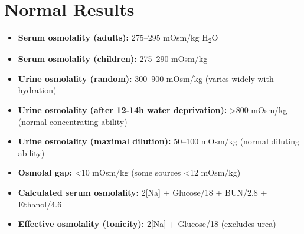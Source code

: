 \section*{Normal Results}
\begin{itemize}
  \item \textbf{Serum osmolality (adults):} 275--295 mOsm/kg H\textsubscript{2}O
  \item \textbf{Serum osmolality (children):} 275--290 mOsm/kg
  \item \textbf{Urine osmolality (random):} 300--900 mOsm/kg (varies widely with hydration)
  \item \textbf{Urine osmolality (after 12-14h water deprivation):} >800 mOsm/kg (normal concentrating ability)
  \item \textbf{Urine osmolality (maximal dilution):} 50--100 mOsm/kg (normal diluting ability)
  \item \textbf{Osmolal gap:} <10 mOsm/kg (some sources <12 mOsm/kg)
  \item \textbf{Calculated serum osmolality:} 2[Na] + Glucose/18 + BUN/2.8 + Ethanol/4.6
  \item \textbf{Effective osmolality (tonicity):} 2[Na] + Glucose/18 (excludes urea)
\end{itemize}

